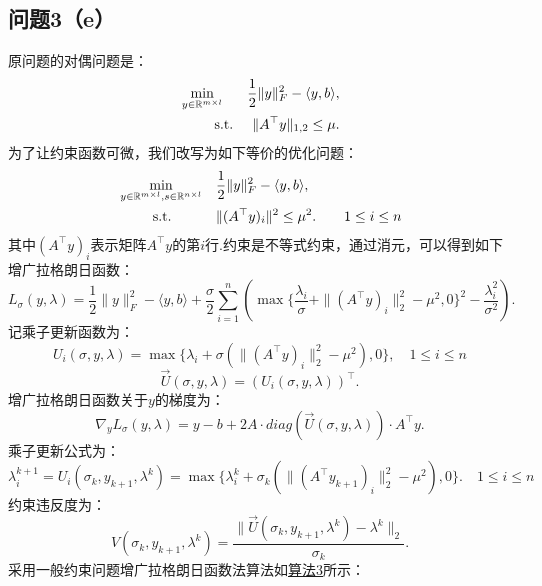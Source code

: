 \documentclass[10pt,a4paper]{article}
\begin{document}
\subsection{问题3（e）}
\indent 原问题的对偶问题是：
\begin{equation*}
\begin{aligned}
	&\min_{y\in\mathbb{R}^{m\times l}}  &\frac{1}{2}\|y\|_F^2 - \langle y, b\rangle,\\
	&\text{\quad\quad\, s.t.} &\|A^{\top}y\|_{1,2}\leq\mu.
\end{aligned}
\end{equation*}
为了让约束函数可微，我们改写为如下等价的优化问题：
\begin{equation*}
	\begin{aligned}
		&\min_{y\in\mathbb{R}^{m\times l},s\in\mathbb{R}^{n\times l}}  &&\frac{1}{2}\|y\|_F^2 - \langle y, b\rangle,\\
		&\text{\quad\quad\, s.t.} &&\|(A^{\top}y)_{i}\|^{2}\leq\mu^{2}.\qquad 1\leq i\leq n
	\end{aligned}
\end{equation*}
其中$(A^{\top}y)_{i}$表示矩阵$A^{\top}y$的第$i$行.约束是不等式约束，通过消元，可以得到如下增广拉格朗日函数：
$$L_{\sigma}(y,\lambda)=\frac{1}{2}\|y\|_F^2 - \langle y, b\rangle+\frac{\sigma}{2}\sum\limits_{i=1}^{n}(\max\{\frac{\lambda_{i}}{\sigma}+\|(A^{\top}y)_{i}\|_{2}^{2}-\mu^{2},0\}^{2}-\frac{\lambda_{i}^{2}}{\sigma^{2}}).
$$
记乘子更新函数为：
$$U_{i}(\sigma,y,\lambda)=\max\{\lambda_{i}+\sigma(\|(A^{\top}y)_{i}\|_{2}^{2}-\mu^{2}),0\},\quad 1\leq i\leq n$$
$$\vec{U}(\sigma,y,\lambda)=(U_{i}(\sigma,y,\lambda))^{\top}.$$
增广拉格朗日函数关于$y$的梯度为：
$$\nabla_{y}L_{\sigma}(y,\lambda)=y-b+2A\cdot diag(\vec{U}(\sigma,y,\lambda))\cdot A^{\top}y.$$
乘子更新公式为：
$$\lambda_{i}^{k+1}=U_{i}(\sigma_{k},y_{k+1},\lambda^{k})=\max\{\lambda_{i}^{k}+\sigma_{k}(\|(A^{\top}y_{k+1})_{i}\|_{2}^{2}-\mu^{2}),0\}.\quad 1\leq i\leq n$$
约束违反度为：
$$V(\sigma_{k},y_{k+1},\lambda^{k})=\frac{\|\vec{U}(\sigma_{k},y_{k+1},\lambda^{k})-\lambda^{k}\|_{2}}{\sigma_{k}}.$$
采用一般约束问题增广拉格朗日函数法算法如\hyperref[alg 3]{算法3}所示：\\
\end{document}
